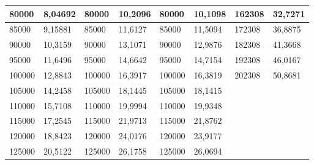 \documentclass[11pt,openany]{book}
\begin{document}
\begin{table}[!ht]
\begin{tabular}{|l|l|l|l|l|l|l|l|}
        80000 & 8,04692 & 80000 & 10,2096 & 80000 & 10,1098 & 162308 & 32,7271 \\ \hline
        85000 & 9,15881 & 85000 & 11,6127 & 85000 & 11,5094 & 172308 & 36,8875 \\ \hline
        90000 & 10,3159 & 90000 & 13,1071 & 90000 & 12,9876 & 182308 & 41,3668 \\ \hline
        95000 & 11,6496 & 95000 & 14,6642 & 95000 & 14,7154 & 192308 & 46,0167 \\ \hline
        100000 & 12,8843 & 100000 & 16,3917 & 100000 & 16,3819 & 202308 & 50,8681 \\ \hline
        105000 & 14,2458 & 105000 & 18,1445 & 105000 & 18,1415 & ~ & ~ \\ \hline
        110000 & 15,7108 & 110000 & 19,9994 & 110000 & 19,9348 & ~ & ~ \\ \hline
        115000 & 17,2545 & 115000 & 21,9713 & 115000 & 21,8762 & ~ & ~ \\ \hline
        120000 & 18,8423 & 120000 & 24,0176 & 120000 & 23,9177 & ~ & ~ \\ \hline
        125000 & 20,5122 & 125000 & 26,1758 & 125000 & 26,0694 & ~ & \\\hline
    \end{tabular}
\end{table}
\end{document}
